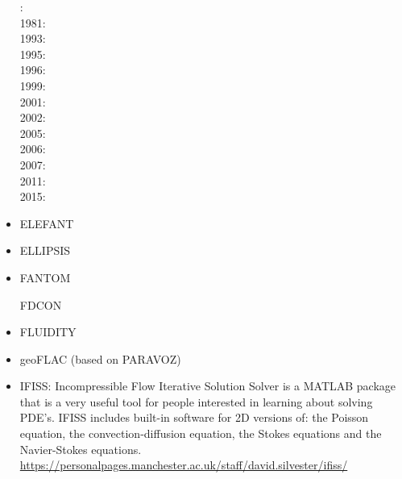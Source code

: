 \begin{itemize}
: \cite{mera80}\\
1981: \cite{mera81}\\
1993: \cite{gowo93}\\
1995: \cite{gowo95}\\
1996: \cite{guez96}\\
1999: \cite{gowo99}\\
2001: \cite{bugw01}\cite{gome01}\\
2002: \cite{bugw02}\\
2005: \cite{gowo05}\cite{vanw05}\cite{vabl05}\\
2006: \cite{degw06}\cite{libi06}\\
2007: \cite{vabl07}\\
2011: \cite{bagw11}\cite{bagw11b}\\
2015: \cite{mags15}

\item ELEFANT

\cite{tosn15}
\cite{matv15}
\cite{busa16}
\cite{latb17}
\cite{thie17}
\cite{pltv18}
\cite{wohu19}

\item ELLIPSIS

\cite{modm03}
\cite{omma06} 
\cite{moql07}
\cite{dyrm07}
\cite{onlg08}
\cite{pyeg10}
\cite{legu11}
\cite{lega12}


\item FANTOM

\cite{thie11}
\cite{alht11}
\cite{alht12}
\cite{alhf13}
\cite{erhv14}
\cite{thsh14}
\cite{erhv15}
\cite{erhv19}

\index FDCON

\cite{enbs05}
\cite{fusc13}
\cite{fuks15}


\item FLUIDITY
\cite{dawk11}
\cite{gagd14}

\item geoFLAC (based on PARAVOZ)
\cite{jala19}

\item IFISS: Incompressible Flow Iterative Solution Solver is a
MATLAB package that is a very useful tool for people interested in
learning about solving PDE’s.
IFISS includes built-in software for 2D versions of:
the Poisson equation, the convection-diffusion equation, the Stokes equations
and the Navier-Stokes equations.\\
\url{https://personalpages.manchester.ac.uk/staff/david.silvester/ifiss/}




\end{itemize}
